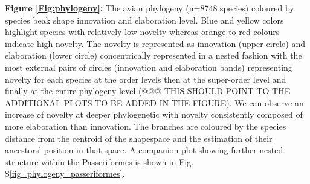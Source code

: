 \documentclass[12pt,letterpaper]{article}
\begin{document}
\bigskip

\noindent \textbf{Figure \ref{Fig:phylogeny}:} The avian phylogeny (n=8748 species) coloured by species beak shape innovation and elaboration level.
Blue and yellow colors highlight species with relatively low novelty whereas orange to red colours indicate high novelty.
The novelty is represented as innovation (upper circle) and elaboration (lower circle) concentrically represented in a nested fashion with the most external pairs of circles (innovation and elaboration bands) representing novelty for each species at the order levels then at the super-order level and finally at the entire phylogeny level (@@@ THIS SHOULD POINT TO THE ADDITIONAL PLOTS TO BE ADDED IN THE FIGURE).
We can observe an increase of novelty at deeper phylogenetic with novelty consistently composed of more elaboration than innovation.
The branches are coloured by the species distance from the centroid of the shapespace and the estimation of their ancestors' position in that space.
A companion plot showing further nested structure within the Passeriformes is shown in Fig. S\ref{fig_phylogeny_passeriformes}.
\end{document}
